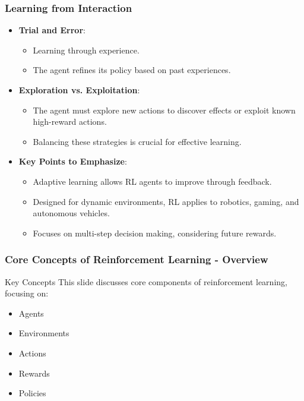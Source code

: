 \documentclass[aspectratio=169]{beamer}
\begin{document}
\begin{frame}[fragile]
    \frametitle{Learning from Interaction}

    \begin{itemize}
        \item \textbf{Trial and Error}: 
        \begin{itemize}
            \item Learning through experience.
            \item The agent refines its policy based on past experiences.
        \end{itemize}

        \item \textbf{Exploration vs. Exploitation}:
        \begin{itemize}
            \item The agent must explore new actions to discover effects or exploit known high-reward actions.
            \item Balancing these strategies is crucial for effective learning.
        \end{itemize}

        \item \textbf{Key Points to Emphasize}:
        \begin{itemize}
            \item Adaptive learning allows RL agents to improve through feedback.
            \item Designed for dynamic environments, RL applies to robotics, gaming, and autonomous vehicles.
            \item Focuses on multi-step decision making, considering future rewards.
        \end{itemize}
    \end{itemize}
\end{frame}

\begin{frame}[fragile]
    \frametitle{Core Concepts of Reinforcement Learning - Overview}
    \begin{block}{Key Concepts}
        This slide discusses core components of reinforcement learning, focusing on:
        \begin{itemize}
            \item Agents
            \item Environments
            \item Actions
            \item Rewards
            \item Policies
        \end{itemize}
    \end{block}
\end{frame}
\end{document}
